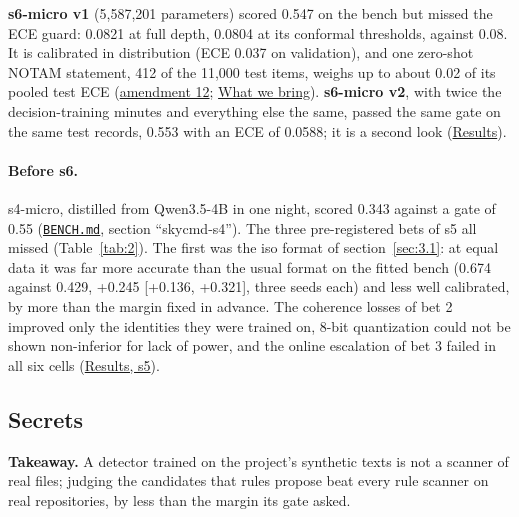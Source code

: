 \documentclass[10pt]{article}
\begin{document}
\textbf{s6-micro v1} (5,587,201 parameters) scored 0.547 on the bench but missed the ECE guard: 0.0821 at full depth, 0.0804 at its conformal thresholds, against 0.08. It is calibrated in distribution (ECE 0.037 on validation), and one zero-shot NOTAM statement, 412 of the 11,000 test items, weighs up to about 0.02 of its pooled test ECE (\href{https://github.com/maxgfr/skycmd/blob/main/docs/s6-gen-prereg.md}{amendment 12}; \href{https://maxgfr.github.io/skycmd/novelty/\#at-a-glance}{What we bring}). \textbf{s6-micro v2}, with twice the decision-training minutes and everything else the same, passed the same gate on the same test records, 0.553 with an ECE of 0.0588; it is a second look (\href{https://maxgfr.github.io/skycmd/results/\#s6-micro-v2-passed-on-a-second-look}{Results}).

\paragraph{Before s6.} s4-micro, distilled from Qwen3.5-4B in one night, scored 0.343 against a gate of 0.55 (\href{https://github.com/maxgfr/skycmd/blob/main/BENCH.md}{\texttt{BENCH.md}}, section ``skycmd-s4''). The three pre-registered bets of s5 all missed (Table~\ref{tab:2}). The first was the iso format of section~\ref{sec:3.1}: at equal data it was far more accurate than the usual format on the fitted bench (0.674 against 0.429, +0.245 [+0.136, +0.321], three seeds each) and less well calibrated, by more than the margin fixed in advance. The coherence losses of bet 2 improved only the identities they were trained on, 8-bit quantization could not be shown non-inferior for lack of power, and the online escalation of bet 3 failed in all six cells (\href{https://maxgfr.github.io/skycmd/results/\#s5-october-2026}{Results, s5}).

\subsection{Secrets}\label{sec:6.2}

\textbf{Takeaway.} A detector trained on the project's synthetic texts is not a scanner of real files; judging the candidates that rules propose beat every rule scanner on real repositories, by less than the margin its gate asked.
\end{document}
